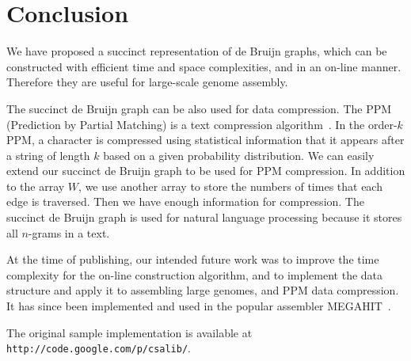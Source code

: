 
\section{Conclusion}\label{p1-sec:conclusion}
We have proposed a succinct representation of de Bruijn graphs,
which can be constructed with efficient time and space complexities,
and in an on-line manner.
Therefore they are useful for large-scale genome assembly.

The succinct de Bruijn graph can be also used for data compression.
The PPM (Prediction by Partial Matching) is a text compression algorithm~\cite{CleWit84}.
In the order-$k$ PPM, a character is compressed using statistical information
that it appears after a string of length $k$ based on a given probability distribution.
We can easily extend our succinct de Bruijn graph to be used for PPM compression.
In addition to the array $W$, we use another array to store the numbers of times
that each edge is traversed.  Then we have enough information for compression.
The succinct de Bruijn graph is used for natural language processing because
it stores all $n$-grams in a text.

At the time of publishing, our intended future work was to improve the time complexity for
the on-line construction algorithm, and to implement the data structure and apply it to
assembling large genomes, and PPM data compression. It has since been implemented and used
in the popular assembler MEGAHIT~\cite{megahit}.

The original sample implementation is available at {\tt http://code.google.com/p/csalib/}.








